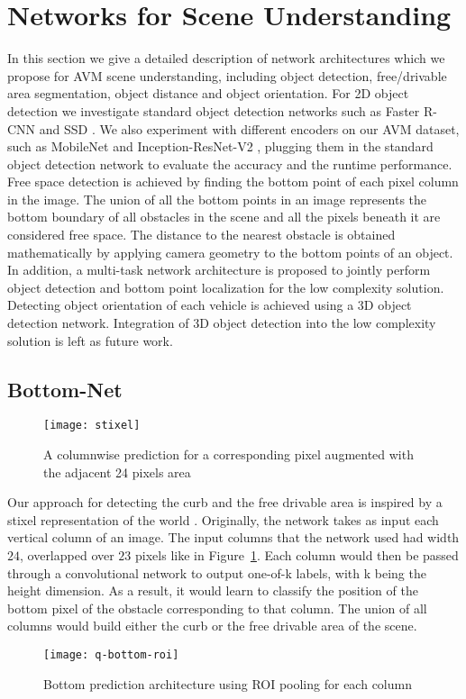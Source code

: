 \documentclass[10pt,twocolumn,letterpaper]{article}
\begin{document}
\section{Networks for Scene Understanding}
In this section we give a detailed description of network architectures which we propose for AVM scene understanding, including object detection, free/drivable area segmentation, object distance and object orientation. For 2D object detection we investigate standard object detection networks such as Faster R-CNN and SSD \cite{ssd}. We also experiment with different encoders on our AVM dataset, such as MobileNet \cite{mobilenet} and Inception-ResNet-V2 \cite{inc-res-v2}, plugging them in the standard object detection network to evaluate the accuracy and the runtime performance. Free space detection is achieved by finding the bottom point of each pixel column in the image. The union of all the bottom points in an image represents the bottom boundary of all obstacles in the scene and all the pixels beneath it are considered free space. The distance to the nearest obstacle is obtained mathematically by applying camera geometry to the bottom points of an object. In addition, a multi-task network architecture is proposed to jointly perform object detection and bottom point localization for the low complexity solution. Detecting object orientation of each vehicle  is achieved using a 3D object detection network. Integration of 3D object detection into the low complexity solution is left as future work.

\subsection{Bottom-Net}

\begin{figure}[t]
\begin{center}
\texttt{[image: stixel]}
\end{center}
   \caption{A columnwise prediction for a corresponding pixel augmented with the adjacent 24 pixels area}
\label{fig:stixel}
\end{figure}

Our approach for detecting the curb and the free drivable area is inspired by a stixel representation of the world \cite{stixel-world} \cite{stixelnet}. Originally, the network takes as input each vertical column of an image. The input columns that the network used had width $24$, overlapped over $23$ pixels like in Figure~\ref{fig:stixel}. Each column would then be passed through a convolutional network to output one-of-k labels, with k being the height dimension. As a result, it would learn to classify the position of the bottom pixel of the obstacle corresponding to that column. The union of all columns would build either the curb or the free drivable area of the scene.
\begin{figure}[t]
\begin{center}
\texttt{[image: q-bottom-roi]}
\end{center}
   \caption{Bottom prediction architecture using ROI pooling for each column}
\label{fig:q-bottom-roi}
\end{figure}
\end{document}
